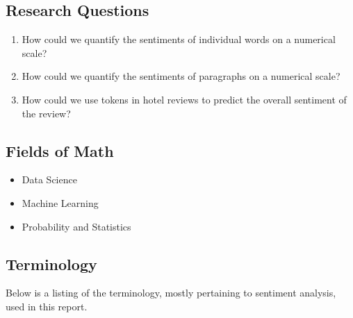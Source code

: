 \documentclass[12pt,bibliography=totocnumbered]{scrartcl}
\begin{document}
{\subsection{Research Questions}
\begin{enumerate}
	\item How could we quantify the sentiments of individual words on a numerical scale?
	\item How could we quantify the sentiments of paragraphs on a numerical scale?
	\item How could we use tokens in hotel reviews to predict the overall sentiment of the review?
\end{enumerate}

\subsection{Fields of Math}
\begin{itemize}
	\item Data Science
	\item Machine Learning
	\item Probability and Statistics
\end{itemize}

\subsection{Terminology}
Below is a listing of the terminology, mostly pertaining to sentiment
analysis, used in this report.

}
\end{document}
